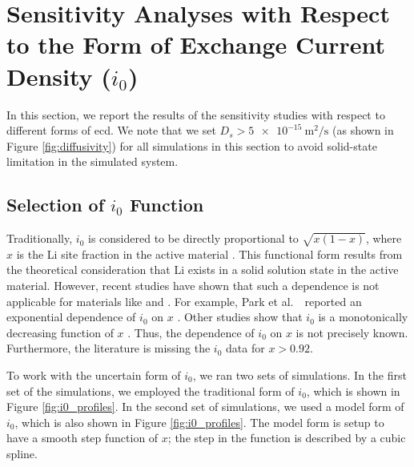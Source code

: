 \documentclass{article}
\begin{document}
\section{Sensitivity Analyses with Respect to the Form of Exchange Current Density ($i_0$)}

In this section, we report the results of the sensitivity studies with
respect to different forms of \gls{ecd}. We note that we set $D_s>
\SI{5e-15}{\meter\squared\per\second}$ (as shown in Figure
\ref{fig:diffusivity}) for all simulations in this section to avoid
solid-state limitation in the simulated system.


\subsection{Selection of $i_0$ Function}

Traditionally, $i_0$ is considered to be directly proportional to
$\sqrt{x\left(1-x\right)}$, where $x$ is the Li site fraction in the
active
material \cite{newman1993,newman1994-2,newman1995-2,newman1996}. This
functional form results from the theoretical consideration that Li
exists in a solid solution state in the active material. However,
recent studies have shown that such a dependence is not applicable for
materials like \nca{} \cite{chueh2021} and \nmc{} \cite{mukherjee2017,chiang2020,tsai2018}. For
example, Park et al.\ \cite{chueh2021}\ reported an exponential
dependence of $i_0$ on $x$ \cite{chueh2021}. Other studies show that
$i_0$ is a monotonically decreasing function of
$x$ \cite{mukherjee2017,chiang2020,tsai2018}. Thus, the dependence of $i_0$ on $x$ is not
precisely known. Furthermore, the literature is missing the $i_0$ data
for $x>0.92$.

To work with the uncertain form of $i_0$, we ran two sets of
simulations. In the first set of the simulations, we employed the
traditional form of $i_0$, which is shown in Figure \ref{fig:i0_profiles}. In
the second set of simulations, we used a model form of $i_0$, which is
also shown in Figure \ref{fig:i0_profiles}. The model form is setup to have a
smooth step function of $x$; the step in the function is described by
a cubic spline.
\end{document}
